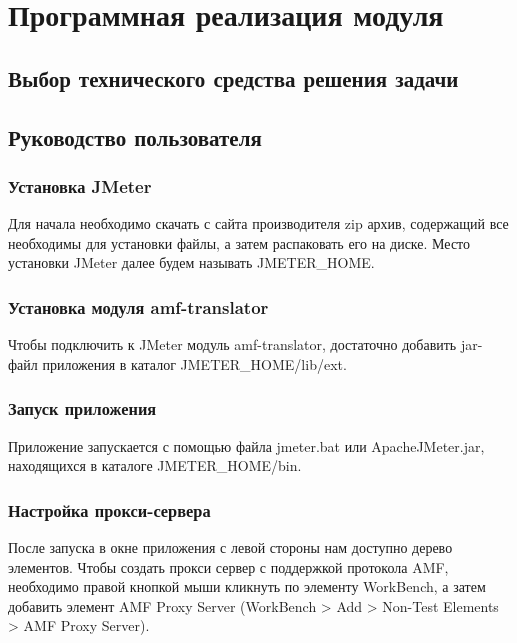\chapter{Программная реализация модуля}

\section{Выбор технического средства решения задачи}

\section{Руководство пользователя}

\subsection{Установка JMeter}

Для начала необходимо скачать с сайта производителя zip архив, содержащий все необходимы для установки файлы,
а затем распаковать его на диске. Место установки JMeter далее будем называть JMETER\_HOME.

\subsection{Установка модуля amf-translator}

Чтобы подключить к JMeter модуль amf-translator, достаточно добавить jar-файл приложения в каталог JMETER\_HOME/lib/ext.

\subsection{Запуск приложения}

Приложение запускается с помощью файла jmeter.bat или ApacheJMeter.jar, находящихся в каталоге JMETER\_HOME/bin.

\subsection{Настройка прокси-сервера}

После запуска в окне приложения с левой стороны нам доступно дерево элементов. Чтобы создать прокси сервер
с поддержкой протокола AMF, необходимо правой кнопкой мыши кликнуть по элементу WorkBench,
а затем добавить элемент AMF Proxy Server (WorkBench > Add > Non-Test Elements > AMF Proxy Server).


